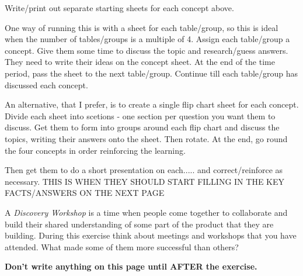         Write/print out separate starting sheets for each concept above.
        
        One way of running this is with a sheet for each table/group, so this is ideal when the number of tables/groups is a multiple of 4. Assign each table/group a concept. Give them some time to discuss the topic and research/guess answers. They need to write their ideas on the concept sheet. At the end of the time period, pass the sheet to the next table/group. Continue till each table/group has discussed each concept. 
        
        An alternative, that I prefer, is to create a single flip chart sheet for each concept. Divide each sheet into scetions - one section per question you want them to discuss. Get them to form into groups around each flip chart and discuss the topics, writing their answers onto the sheet. Then rotate. At the end, go round the four concepts in order reinforcing the learning.
        
        Then get them to do a short presentation on each..... and correct/reinforce as necessary. THIS IS WHEN THEY SHOULD START FILLING IN THE KEY FACTS/ANSWERS ON THE NEXT PAGE
\fi

\ifcontent
    A \emph{Discovery Workshop} is a time when people come together to collaborate and build their shared understanding of some part of the product that they are building. During this exercise think about meetings and workshops that you have attended. What made some of them more successful than others? 
    
    \textbf{Don't write anything on this page until AFTER the exercise.}\\
    
